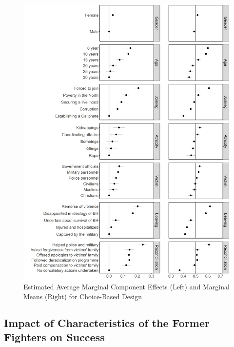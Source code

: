 \begin{figure}[H]
\includegraphics[width=\textwidth]{Chapter_3/art2-figure2.jpeg}
\caption{Estimated Average Marginal Component Effects (Left) and Marginal Means (Right) for Choice-Based Design}
\label{fig:art2-fig2}    
\end{figure}

\newpage
\subsection{Impact of Characteristics of the Former Fighters on Success}


